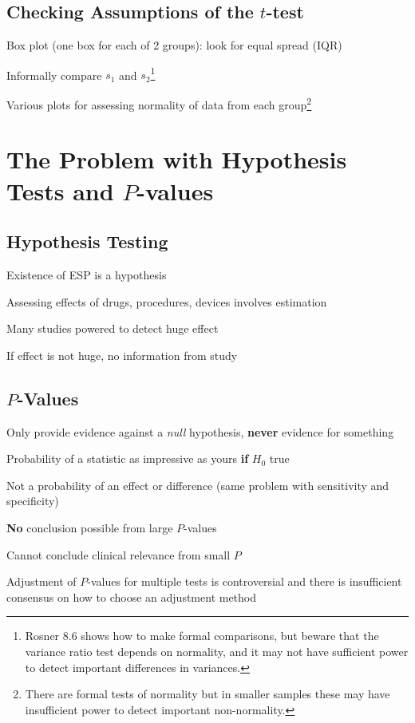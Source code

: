 \subsection{Checking Assumptions of the $t$-test}
\bi
\item Box plot (one box for each of 2 groups): look for equal spread
  (IQR)
\item Informally compare $s_{1}$ and $s_{2}$\footnote{Rosner 8.6 shows how to
  make formal comparisons, but beware that the variance ratio test
  depends on normality, and it may not have sufficient power to detect
  important differences in variances.}
\item Various plots for assessing normality of data from each
  group\footnote{There are formal tests of normality but in smaller
    samples these may have insufficient power to detect important
    non-normality.}
\ei

\section{The Problem with Hypothesis Tests and $P$-values}
\subsection{Hypothesis Testing}
\bi
\item Existence of ESP is a hypothesis
\item Assessing effects of drugs, procedures, devices involves
  estimation
\item Many studies powered to detect huge effect
\item If effect is not huge, no information from study
\ei

\subsection{$P$-Values} 
\bi
\item Only provide evidence against a \emph{null} hypothesis,
  \textbf{never} evidence for something
\item Probability of a statistic as impressive as yours \textbf{\Large
    if} $H_0$ true
\item Not a probability of an effect or difference (same problem with
  sensitivity and specificity)
\item \textbf{No} conclusion possible from large $P$-values
\item Cannot conclude clinical relevance from small $P$
\item Adjustment of $P$-values for multiple tests is controversial and
  there is insufficient consensus on how to choose an adjustment
  method
\ei

